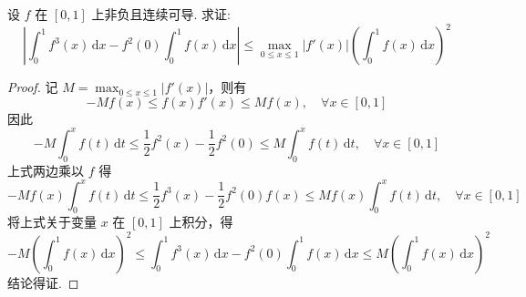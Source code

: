 \documentclass[../../main.tex]{subfiles}
\begin{document}
\begin{example}
设 \( f \) 在 \([0,1]\) 上非负且连续可导. 求证:
\[
\left| \int_{0}^{1} f^3(x) \, \mathrm{d}x - f^2(0) \int_{0}^{1} f(x) \, \mathrm{d}x \right| \leqslant \max_{0 \leqslant x \leqslant 1} |f'(x)| \left( \int_{0}^{1} f(x) \, \mathrm{d}x \right)^2
\]
\end{example}
\begin{proof}
记 \( M = \max_{0 \leqslant x \leqslant 1} |f'(x)| \)，则有
\[
-M f(x) \leqslant f(x) f'(x) \leqslant M f(x), \quad \forall x \in [0,1]
\]
因此
\[
-M \int_{0}^{x} f(t) \, \mathrm{d}t \leqslant \frac{1}{2} f^2(x) - \frac{1}{2} f^2(0) \leqslant M \int_{0}^{x} f(t) \, \mathrm{d}t, \quad \forall x \in [0,1]
\]
上式两边乘以 \( f \) 得
\[
-M f(x) \int_{0}^{x} f(t) \, \mathrm{d}t \leqslant \frac{1}{2} f^3(x) - \frac{1}{2} f^2(0) f(x) \leqslant M f(x) \int_{0}^{x} f(t) \, \mathrm{d}t, \quad \forall x \in [0,1]
\]
将上式关于变量 \( x \) 在 \([0,1]\) 上积分，得
\[
-M \left( \int_{0}^{1} f(x) \, \mathrm{d}x \right)^2 \leqslant \int_{0}^{1} f^3(x) \, \mathrm{d}x - f^2(0) \int_{0}^{1} f(x) \, \mathrm{d}x \leqslant M \left( \int_{0}^{1} f(x) \, \mathrm{d}x \right)^2
\]
结论得证.

\end{proof}
\end{document}
